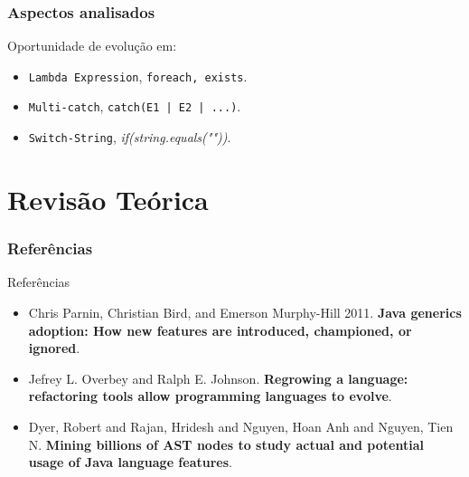 \documentclass[]{beamer}
\begin{document}
	\begin{frame}[label=ApectosAnalisados]
		\frametitle{Aspectos analisados}
		
			\begin{block}{Oportunidade de evolução em:}
				\begin{itemize}
					\item \texttt{Lambda Expression}, \texttt{foreach, exists}.
					\item \texttt{Multi-catch}, \texttt{catch(E1 | E2 | ...)}.
					\item \texttt{Switch-String}, \textit{if(string.equals(""))}.
				\end{itemize}
			\end{block}
	\end{frame}
	

	
%			



	\section{Revisão Teórica}
	\frametitle{Referências}
	\begin{frame}[label=referencias]
		\begin{block}{Referências}
			\begin{itemize}
				\item Chris Parnin, Christian Bird, and Emerson Murphy-Hill 2011. \textbf{Java generics adoption: How new features are introduced, championed, or ignored}.
				
				\item Jefrey L. Overbey and Ralph E. Johnson. \textbf{Regrowing a language: refactoring tools
				allow programming languages to evolve}.
				
				\item Dyer, Robert and Rajan, Hridesh and Nguyen, Hoan Anh and Nguyen, Tien N. \textbf{Mining billions of AST nodes to study actual and potential usage of Java language features}.
			\end{itemize}
			
		\end{block}
	\end{frame}
	
\end{document}
